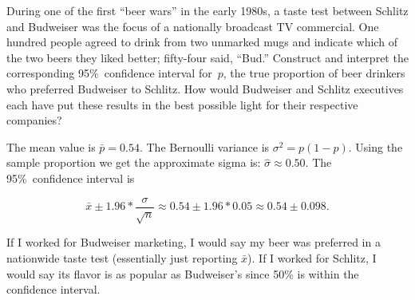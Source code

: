 \begin{problem}
   During one of the first ``beer wars'' in the early 1980s, a taste test between Schlitz and Budweiser was the focus of a nationally broadcast TV commercial. One hundred people agreed to drink from two unmarked mugs and indicate which of the two beers they liked better; fifty-four said, ``Bud.'' Construct and interpret the corresponding 95\%~confidence interval for~$p$, the true proportion of beer drinkers who preferred Budweiser to Schlitz. How would Budweiser and Schlitz executives each have put these results in the best possible light for their respective companies?
\end{problem}

The mean value is ${\bar{p}=0.54}$.  The Bernoulli variance is ${\sigma^2 = p(1-p)}$.  Using the sample proportion we get the approximate sigma is: ${\hat{\sigma} \approx 0.50}$.  The 95\%~confidence interval is

\begin{equation*}
  \bar{x} \pm 1.96 * \frac{\sigma}{\sqrt{n}} \approx 0.54 \pm 1.96 * 0.05 \approx 0.54 \pm 0.098 \text{.}
\end{equation*}

If I worked for Budweiser marketing, I would say my beer was preferred in a nationwide taste test (essentially just reporting $\bar{x}$).  If I worked for Schlitz, I would say its flavor is as popular as Budweiser's since 50\% is within the confidence interval.
